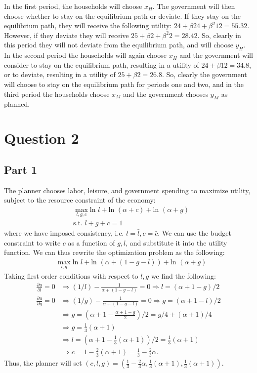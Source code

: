 \documentclass[11pt]{article} %
\begin{document}
In the first period, the households will choose $x_H$. The government will then choose whether to stay on the equilibrium path or deviate. If they stay on the equilibrium path, they will receive the following utility: $24 + \beta 24 + \beta^2 12 = 55.32 $. However, if they deviate they will receive $25 + \beta 2 +\beta^2 2 = 28.42$. So, clearly in this period they will not deviate from the equilibrium path, and will choose $y_H$. In the second period the households will again choose $x_H$ and the government will consider to stay on the equilibrium path, resulting in a utility of $24+\beta 12 = 34.8$, or to deviate, resulting in a utility of $25 +\beta 2 = 26.8$. So, clearly the government will choose to stay on the equilibrium path for periods one and two, and in the third period the households choose $x_M$ and the government chooses $y_M$ as planned. 

\section{Question 2}
\subsection{Part 1}
The planner chooses labor, leisure, and government spending to maximize utility, subject to the resource constraint of the economy:
\begin{align*}
&\max_{l,g,c} \text{ln }l +\text{ln }(\alpha + c) +\text{ln }(\alpha + g)\\
&\text{s.t. } l+g+c = 1
\end{align*}
where we have imposed consistency, i.e. $l = \bar{l},c = \bar{c}$. We can use the budget constraint to write $c$ as a function of $g,l$, and substitute it into the utility function. We can thus rewrite the optimization problem as the following:
 \begin{align*}
&\max_{l,g} \text{ln }l +\text{ln }(\alpha + (1-g-l)) +\text{ln }(\alpha + g)
\end{align*}
Taking first order conditions with respect to $l,g$ we find the following:
\begin{align*}
\frac{\partial u}{\partial l} = 0 &\Rightarrow  (1/l) - \frac{1}{\alpha + (1-g-l)} = 0 \Rightarrow l = (\alpha + 1 - g)/2\\
\frac{\partial u}{\partial g} = 0 &\Rightarrow  (1/g) - \frac{1}{\alpha + (1-g-l)} = 0 \Rightarrow g = (\alpha+1 - l)/2 \\
&\Rightarrow g = \left(\alpha +1 - \frac{\alpha +1 - g}{2}\right)/2 = g/4+(\alpha+1)/4 \\
&\Rightarrow g = \frac{1}{3}(\alpha+1)\\
&\Rightarrow l = \left( \alpha + 1 - \frac{1}{3}(\alpha+1) \right)/2 = \frac{1}{3}(\alpha+1)\\
&\Rightarrow c = 1 - \frac{2}{3}(\alpha+1) = \frac{1}{3} - \frac{2}{3}\alpha.
\end{align*}
Thus, the planner will set $(c,l,g) = \left( \frac{1}{3} - \frac{2}{3}\alpha,\frac{1}{3}(\alpha+1) , \frac{1}{3}(\alpha+1) \right)$.
\end{document}
